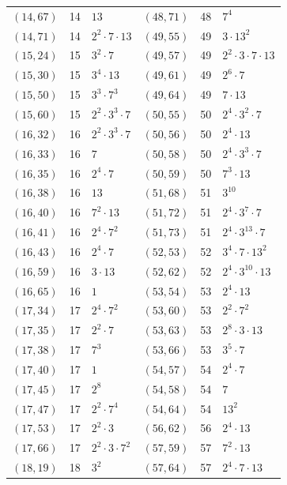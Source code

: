 \documentclass[11pt]{article}
\begin{document}
\begin{longtable}{@{}lrl@{\qquad}lrl@{}}
$(14,67)$ & 14 & $13$ & $(48,71)$ & 48 & $7^{4}$\\
$(14,71)$ & 14 & $2^{2}\cdot 7\cdot 13$ & $(49,55)$ & 49 & $3\cdot 13^{2}$\\
$(15,24)$ & 15 & $3^{2}\cdot 7$ & $(49,57)$ & 49 & $2^{2}\cdot 3\cdot 7\cdot 13$\\
$(15,30)$ & 15 & $3^{4}\cdot 13$ & $(49,61)$ & 49 & $2^{6}\cdot 7$\\
$(15,50)$ & 15 & $3^{3}\cdot 7^{3}$ & $(49,64)$ & 49 & $7\cdot 13$\\
$(15,60)$ & 15 & $2^{2}\cdot 3^{3}\cdot 7$ & $(50,55)$ & 50 & $2^{4}\cdot 3^{2}\cdot 7$\\
$(16,32)$ & 16 & $2^{2}\cdot 3^{3}\cdot 7$ & $(50,56)$ & 50 & $2^{4}\cdot 13$\\
$(16,33)$ & 16 & $7$ & $(50,58)$ & 50 & $2^{4}\cdot 3^{3}\cdot 7$\\
$(16,35)$ & 16 & $2^{4}\cdot 7$ & $(50,59)$ & 50 & $7^{3}\cdot 13$\\
$(16,38)$ & 16 & $13$ & $(51,68)$ & 51 & $3^{10}$\\
$(16,40)$ & 16 & $7^{2}\cdot 13$ & $(51,72)$ & 51 & $2^{4}\cdot 3^{7}\cdot 7$\\
$(16,41)$ & 16 & $2^{4}\cdot 7^{2}$ & $(51,73)$ & 51 & $2^{4}\cdot 3^{13}\cdot 7$\\
$(16,43)$ & 16 & $2^{4}\cdot 7$ & $(52,53)$ & 52 & $3^{4}\cdot 7\cdot 13^{2}$\\
$(16,59)$ & 16 & $3\cdot 13$ & $(52,62)$ & 52 & $2^{4}\cdot 3^{10}\cdot 13$\\
$(16,65)$ & 16 & $1$ & $(53,54)$ & 53 & $2^{4}\cdot 13$\\
$(17,34)$ & 17 & $2^{4}\cdot 7^{2}$ & $(53,60)$ & 53 & $2^{2}\cdot 7^{2}$\\
$(17,35)$ & 17 & $2^{2}\cdot 7$ & $(53,63)$ & 53 & $2^{8}\cdot 3\cdot 13$\\
$(17,38)$ & 17 & $7^{3}$ & $(53,66)$ & 53 & $3^{5}\cdot 7$\\
$(17,40)$ & 17 & $1$ & $(54,57)$ & 54 & $2^{4}\cdot 7$\\
$(17,45)$ & 17 & $2^{8}$ & $(54,58)$ & 54 & $7$\\
$(17,47)$ & 17 & $2^{2}\cdot 7^{4}$ & $(54,64)$ & 54 & $13^{2}$\\
$(17,53)$ & 17 & $2^{2}\cdot 3$ & $(56,62)$ & 56 & $2^{4}\cdot 13$\\
$(17,66)$ & 17 & $2^{2}\cdot 3\cdot 7^{2}$ & $(57,59)$ & 57 & $7^{2}\cdot 13$\\
$(18,19)$ & 18 & $3^{2}$ & $(57,64)$ & 57 & $2^{4}\cdot 7\cdot 13$\\

\end{longtable}
\end{document}
